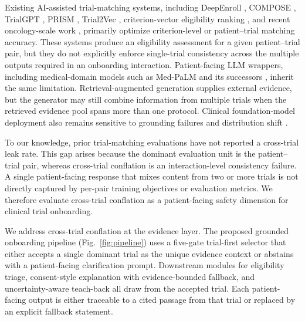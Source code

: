 \documentclass[pdflatex,Numbered]{sn-jnl}
\theoremstyle{plain}
\begin{document}
Existing AI-assisted trial-matching systems, including DeepEnroll \citep{zhang2020deepenroll}, COMPOSE \citep{gao2020compose}, TrialGPT \citep{jin2024trialgpt}, PRISM \citep{gupta2024prism}, Trial2Vec \citep{wang2023trial2vec}, criterion-vector eligibility ranking \citep{bustos2018trial}, and recent oncology-scale work \citep{wong2024scaling,nievas2024distilling,chen2025enhancing}, primarily optimize criterion-level or patient--trial matching accuracy. These systems produce an eligibility assessment for a given patient--trial pair, but they do not explicitly enforce single-trial consistency across the multiple outputs required in an onboarding interaction. Patient-facing LLM wrappers, including medical-domain models such as Med-PaLM and its successors \citep{singhal2023medpalm,singhal2025medpalm2,lievin2024can}, inherit the same limitation. Retrieval-augmented generation \citep{lewis2020rag,karpukhin2020dpr,thakur2021beir,zhao2025medrag,xiong2024benchmarking,neha2025ragsystematic} supplies external evidence, but the generator may still combine information from multiple trials when the retrieved evidence pool spans more than one protocol. Clinical foundation-model deployment also remains sensitive to grounding failures and distribution shift \citep{wornow2023shaky,topol2019deep,obermeyer2019dissecting}.

To our knowledge, prior trial-matching evaluations have not reported a cross-trial leak rate. This gap arises because the dominant evaluation unit is the patient--trial pair, whereas cross-trial conflation is an interaction-level consistency failure. A single patient-facing response that mixes content from two or more trials is not directly captured by per-pair training objectives or evaluation metrics. We therefore evaluate cross-trial conflation as a patient-facing safety dimension for clinical trial onboarding.



We address cross-trial conflation at the evidence layer. The proposed grounded onboarding pipeline (Fig.~\ref{fig:pipeline}) uses a five-gate trial-first selector that either accepts a single dominant trial as the unique evidence context or abstains with a patient-facing clarification prompt. Downstream modules for eligibility triage, consent-style explanation with evidence-bounded fallback, and uncertainty-aware teach-back all draw from the accepted trial. Each patient-facing output is either traceable to a cited passage from that trial or replaced by an explicit fallback statement.
\end{document}
